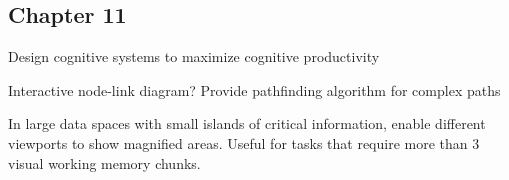 \subsection{Chapter 11}


\begin{compactenum}

\item Design cognitive systems to maximize cognitive productivity

\item Interactive node-link diagram? Provide pathfinding algorithm for
    complex paths

\item In large data spaces with small islands of critical information,
    enable different viewports to show magnified areas. Useful for tasks that
    require more than 3 visual working memory chunks.

\end{compactenum}








